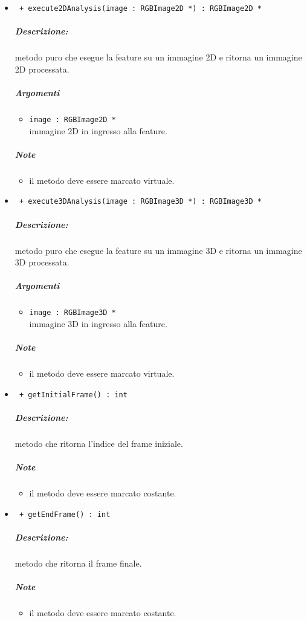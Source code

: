 \begin{itemize}
	\item \color{blue}\verb! + execute2DAnalysis(image : RGBImage2D *) : RGBImage2D *!
		\color{black}
		\subparagraph{Descrizione:} metodo puro che esegue la feature su un immagine 2D e ritorna un immagine 2D 						processata.
		\subparagraph{Argomenti}
			\begin{itemize}
				\item \color{RoyalPurple} \verb!image : RGBImage2D * ! \\ 
				\color{black} immagine 2D in ingresso alla feature.		
			\end{itemize}
		\subparagraph{Note}
			\begin{itemize}
				\item il metodo deve essere marcato virtuale.
			\end{itemize}
			
	\item \color{blue}\verb! + execute3DAnalysis(image : RGBImage3D *) : RGBImage3D *!
		\color{black}
		\subparagraph{Descrizione:} metodo puro che esegue la feature su un immagine 3D e ritorna un immagine 3D 						processata.
		\subparagraph{Argomenti}
			\begin{itemize}
				\item \color{RoyalPurple} \verb!image : RGBImage3D * ! \\ 
				\color{black} immagine 3D in ingresso alla feature.		
			\end{itemize}
		\subparagraph{Note}
			\begin{itemize}
				\item il metodo deve essere marcato virtuale.
			\end{itemize}
			
	\item \color{blue}\verb! + getInitialFrame() : int!
		\color{black}
		\subparagraph{Descrizione:} metodo che ritorna l'indice del frame iniziale.
		\subparagraph{Note}
			\begin{itemize}
				\item il metodo deve essere marcato costante.
			\end{itemize}
			
	\item \color{blue}\verb! + getEndFrame() : int!
		\color{black}
		\subparagraph{Descrizione:} metodo che ritorna il frame finale.
		\subparagraph{Note}
			\begin{itemize}
				\item il metodo deve essere marcato costante.
			\end{itemize}
	

\end{itemize}

